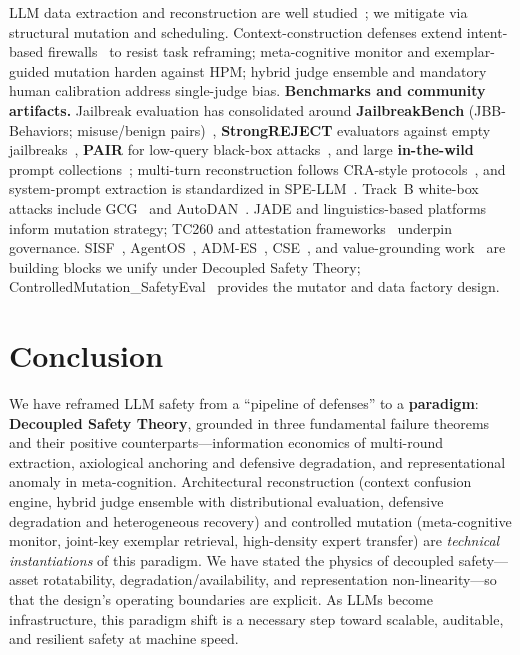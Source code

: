 \documentclass[letterpaper,twocolumn,10pt]{article}
\begin{document}
LLM data extraction and reconstruction are well studied~\cite{llm-reconstruction-emergent,split-ft-attack,active-reconstruction}; we mitigate via structural mutation and scheduling. Context-construction defenses extend intent-based firewalls~\cite{agentos-arxiv} to resist task reframing; meta-cognitive monitor and exemplar-guided mutation harden against HPM; hybrid judge ensemble and mandatory human calibration address single-judge bias. \textbf{Benchmarks and community artifacts.} Jailbreak evaluation has consolidated around \textbf{JailbreakBench} (JBB-Behaviors; misuse/benign pairs)~\cite{jailbreakbench}, \textbf{StrongREJECT} evaluators against empty jailbreaks~\cite{strongreject}, \textbf{PAIR} for low-query black-box attacks~\cite{pair-jailbreak}, and large \textbf{in-the-wild} prompt collections~\cite{wild-jailbreak-prompts}; multi-turn reconstruction follows CRA-style protocols~\cite{cra-reconstruction}, and system-prompt extraction is standardized in SPE-LLM~\cite{spe-llm}. Track~B white-box attacks include GCG~\cite{gcg} and AutoDAN~\cite{autodan}. JADE and linguistics-based platforms~\cite{jade-linguistics,jade-db} inform mutation strategy; TC260 and attestation frameworks~\cite{tc260-governance,tc260-training-data,dual-use-attestations} underpin governance. SISF~\cite{sisf-arxiv}, AgentOS~\cite{agentos-arxiv}, ADM-ES~\cite{adm-es-arxiv}, CSE~\cite{cse-arxiv}, and value-grounding work~\cite{epistemic-grounding,hpm-jailbreak} are building blocks we unify under Decoupled Safety Theory; ControlledMutation\_SafetyEval~\cite{ControlledMutation_SafetyEval} provides the mutator and data factory design.

\section{Conclusion}

We have reframed LLM safety from a ``pipeline of defenses'' to a \textbf{paradigm}: \textbf{Decoupled Safety Theory}, grounded in three fundamental failure theorems and their positive counterparts---information economics of multi-round extraction, axiological anchoring and defensive degradation, and representational anomaly in meta-cognition. Architectural reconstruction (context confusion engine, hybrid judge ensemble with distributional evaluation, defensive degradation and heterogeneous recovery) and controlled mutation (meta-cognitive monitor, joint-key exemplar retrieval, high-density expert transfer) are \emph{technical instantiations} of this paradigm. We have stated the physics of decoupled safety---asset rotatability, degradation/availability, and representation non-linearity---so that the design's operating boundaries are explicit. As LLMs become infrastructure, this paradigm shift is a necessary step toward scalable, auditable, and resilient safety at machine speed.
\end{document}
